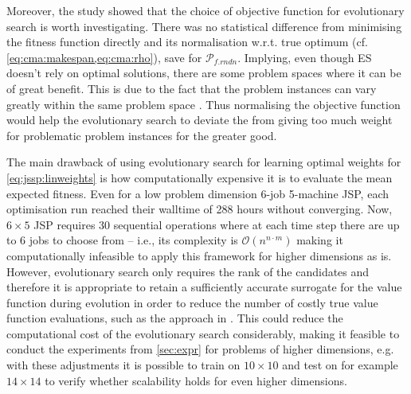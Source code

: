 \documentclass[graybox]{svmult}
\begin{document}
Moreover, the study showed that the choice of objective function  for 
evolutionary search is worth investigating. There was no statistical difference 
from minimising the fitness function directly and its normalisation w.r.t. true 
optimum (cf. \cref{eq:cma:makespan,eq:cma:rho}), save for 
$\mathcal{P}_{f.rndn}$. Implying, even though ES doesn't rely on optimal 
solutions, there are some problem spaces where it can be of great benefit. This 
is due to the fact that the problem instances can vary greatly within the same 
problem space \cite{InRu12}. Thus normalising the objective function would help 
the evolutionary search to deviate the from giving too much weight for 
problematic problem instances for the greater good.


The main drawback of using evolutionary search for learning optimal weights for 
\cref{eq:jssp:linweights} is how computationally expensive it is to evaluate 
the mean expected fitness. Even for a low problem dimension 6-job 5-machine 
JSP, each optimisation run reached their walltime of 288 hours without 
converging. Now, $6\times5$ JSP requires 30 sequential operations where at each 
time step there are up to $6$ jobs to choose from -- i.e., its complexity is 
$\mathcal{O}(n^{n\cdot m})$ making it computationally infeasible to apply this 
framework for higher dimensions as is. 
However, evolutionary search only requires the rank of the candidates and 
therefore it is appropriate to retain a sufficiently accurate surrogate for the 
value function during evolution in order to reduce the number of costly true 
value function evaluations, such as the approach in \cite{InRu11b}. This could 
reduce the computational cost of the evolutionary search considerably, making 
it feasible to conduct the experiments from \cref{sec:expr} for problems of 
higher dimensions, e.g. with these adjustments it is possible to train on 
$10\times10$ and test on for example $14\times14$ to verify whether scalability 
holds for even higher dimensions.  
\end{document}
